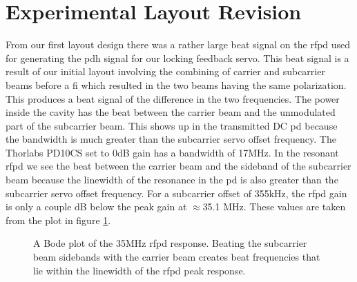 \section{Experimental Layout Revision}
\label{sec:expimps}
From our first layout design there was a rather
large beat signal on the \ac{rfpd} used for generating the \ac{pdh} signal
for our locking feedback servo.
This beat signal is a result of our initial layout involving the combining of
carrier and subcarrier beams before a \ac{fi} which resulted in the two beams
having the same polarization.
This produces a beat signal of the difference in the two frequencies.
The power inside the cavity has the beat between the carrier beam
and the unmodulated part of the subcarrier beam. This shows up in the
transmitted DC \ac{pd} because the bandwidth is much greater than the
subcarrier servo offset frequency. The Thorlabs PD10CS set to 0dB gain has
a bandwidth of 17MHz.
In the resonant \ac{rfpd} we see the beat between the carrier beam and the
sideband of the subcarrier beam because the linewidth of the resonance
in the \ac{pd} is also greater than the subcarrier servo offset frequency.
For a subcarrier offset of 355kHz, the \ac{rfpd} gain is only a couple dB
below the peak gain at $\approx$35.1 MHz.
These values are taken from the plot in figure \ref{fig:rfpd35mhz}.

\begin{figure}
  \caption[35MHz RF Photodiode Response]{
    A Bode plot of the 35MHz \ac{rfpd} response.
    Beating the subcarrier beam sidebands with the carrier beam creates beat
    frequencies that lie within the linewidth of the \ac{rfpd} peak response.
    }
  \label{fig:rfpd35mhz}
\end{figure}


